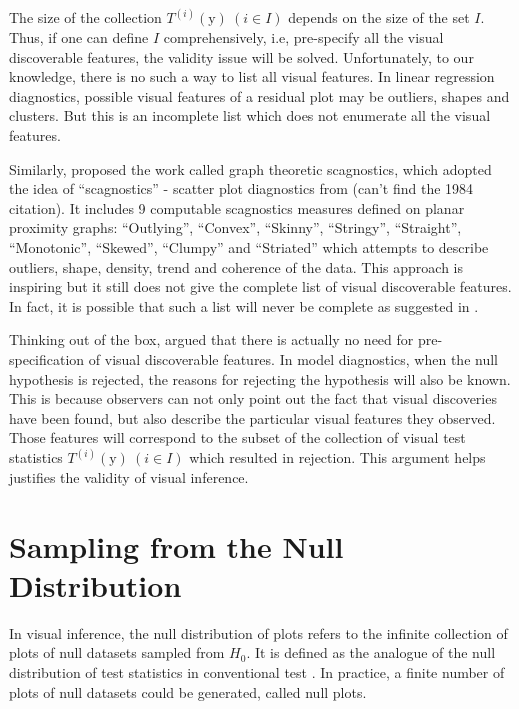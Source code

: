 \documentclass{monashthesis}
\theoremstyle{definition}
\theoremstyle{definition}
\theoremstyle{definition}
\theoremstyle{definition}
\theoremstyle{remark}
\begin{document}
The size of the collection \(T^{(i)}(\boldsymbol{\mathrm{y}})~(i \in I)\) depends on the size of the set \(I\). Thus, if one can define \(I\) comprehensively, i.e, pre-specify all the visual discoverable features, the validity issue will be solved. Unfortunately, to our knowledge, there is no such a way to list all visual features. In linear regression diagnostics, possible visual features of a residual plot may be outliers, shapes and clusters. But this is an incomplete list which does not enumerate all the visual features.

Similarly, \textcite{wilkinson_graph-theoretic_2005} proposed the work called graph theoretic scagnostics, which adopted the idea of ``scagnostics'' - scatter plot diagnostics from (can't find the 1984 citation). It includes 9 computable scagnostics measures defined on planar proximity graphs: ``Outlying'', ``Convex'', ``Skinny'', ``Stringy'', ``Straight'', ``Monotonic'', ``Skewed'', ``Clumpy'' and ``Striated'' which attempts to describe outliers, shape, density, trend and coherence of the data. This approach is inspiring but it still does not give the complete list of visual discoverable features. In fact, it is possible that such a list will never be complete as suggested in \textcite{buja_statistical_2009}.

Thinking out of the box, \textcite{buja_statistical_2009} argued that there is actually no need for pre-specification of visual discoverable features. In model diagnostics, when the null hypothesis is rejected, the reasons for rejecting the hypothesis will also be known. This is because observers can not only point out the fact that visual discoveries have been found, but also describe the particular visual features they observed. Those features will correspond to the subset of the collection of visual test statistics \(T^{(i)}(\boldsymbol{\mathrm{y}})~(i \in I)\) which resulted in rejection. This argument helps justifies the validity of visual inference.

\hypertarget{se:sampling-from-null}{%
\section{Sampling from the Null Distribution}\label{se:sampling-from-null}}

In visual inference, the null distribution of plots refers to the infinite collection of plots of null datasets sampled from \(H_0\). It is defined as the analogue of the null distribution of test statistics in conventional test \autocite{buja_statistical_2009}. In practice, a finite number of plots of null datasets could be generated, called null plots.
\end{document}

